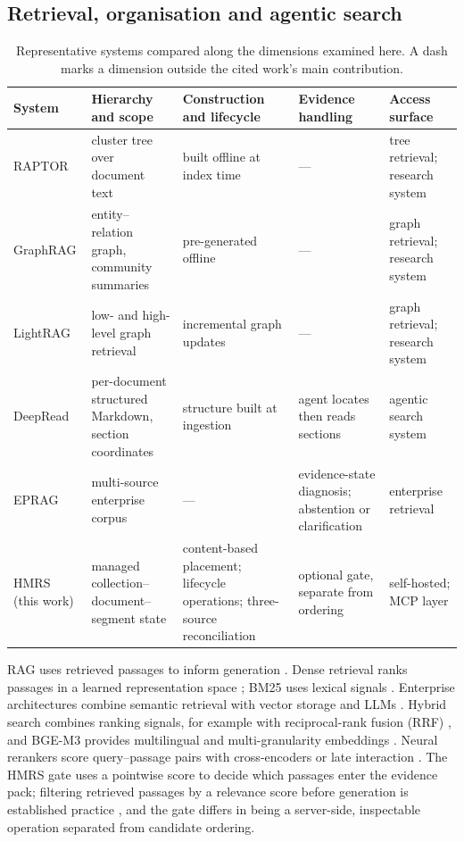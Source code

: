 \subsection{Retrieval, organisation and agentic search}

\begin{table}[!t]
\centering
\small
\setlength{\tabcolsep}{3.5pt}
\renewcommand{\arraystretch}{1.02}
\caption{ Representative systems compared along the dimensions examined here.
A dash marks a dimension outside the cited work's main contribution.}
\label{tab:related-comparison}
\begin{tabular}{@{}>{\raggedright\arraybackslash}p{}>{\raggedright\arraybackslash}p{}>{\raggedright\arraybackslash}p{}>{\raggedright\arraybackslash}p{}>{\raggedright\arraybackslash}p{}@{}}
\toprule
System & Hierarchy and scope & Construction and lifecycle & Evidence handling & Access surface\\
\midrule
RAPTOR \citep{raptor} & cluster tree over document text & built offline at index time & --- & tree retrieval; research system\\
GraphRAG \citep{graphrag} & entity--relation graph, community summaries & pre-generated offline & --- & graph retrieval; research system\\
LightRAG \citep{lightrag} & low- and high-level graph retrieval & incremental graph updates & --- & graph retrieval; research system\\
DeepRead \citep{deepread} & per-document structured Markdown, section coordinates & structure built at ingestion & agent locates then reads sections & agentic search system\\
EPRAG \citep{kinalioglu-kbs-eprag-2026} & multi-source enterprise corpus & --- & evidence-state diagnosis; abstention or clarification & enterprise retrieval\\
HMRS (this work) & managed collection--document--segment state & content-based placement; lifecycle operations; three-source reconciliation & optional gate, separate from ordering & self-hosted; MCP layer\\
\bottomrule
\end{tabular}
\end{table}

RAG uses retrieved passages to inform generation
\citep{rag-lewis,gao-rag-survey-2023}. Dense
retrieval ranks passages in a learned representation space \citep{dpr}; BM25
uses lexical signals \citep{bm25}. Enterprise architectures combine semantic
retrieval with vector storage and LLMs \citep{ghali-kbs-retrieval-2025}.
Hybrid search combines ranking signals, for example with reciprocal-rank
fusion (RRF) \citep{rrf-cormack}, and BGE-M3 provides multilingual and
multi-granularity embeddings \citep{bge-m3}. Neural rerankers score
query--passage pairs with cross-encoders \citep{nogueira-monobert-2019} or
late interaction \citep{khattab-colbert-2020}. The HMRS gate uses a
pointwise score to decide which passages enter the evidence pack;
filtering retrieved passages by a relevance score before generation is
established practice \citep{izacard-grave}, and the gate differs in being
a server-side, inspectable operation separated from candidate ordering.

